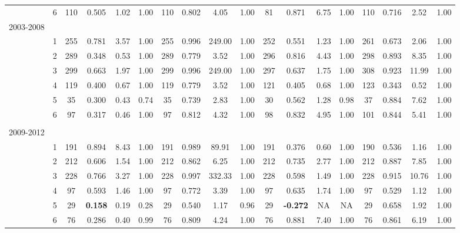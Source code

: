 \begin{sidewaystable}[p]
\begin{tabular}{p{1cm}p{.5cm}cccccccccccccccc}
 & \multicolumn{ 1}{c}{6} & 110 & 0.505 & 1.02  & 1.00  & 110 & 0.802 & 4.05  & 1.00  & 81 & 0.871  & 6.75  & 1.00  & 110 & 0.716  & 2.52  & 1.00  \\ 
2003-2008\\
 & \multicolumn{ 1}{c}{1} & 255 & 0.781  & 3.57  & 1.00  & 255 & 0.996  & 249.00  & 1.00  & 252 & 0.551  & 1.23  & 1.00  & 261 & 0.673  & 2.06  & 1.00  \\ 
 & \multicolumn{ 1}{c}{2} & 289 & 0.348  & 0.53  & 1.00  & 289 & 0.779  & 3.52  & 1.00  & 296 & 0.816  & 4.43  & 1.00  & 298 & 0.893  & 8.35  & 1.00  \\ 
 & \multicolumn{ 1}{c}{3} & 299 & 0.663  & 1.97  & 1.00  & 299 & 0.996  & 249.00  & 1.00  & 297 & 0.637  & 1.75  & 1.00  & 308 & 0.923  & 11.99  & 1.00  \\ 
 & \multicolumn{ 1}{c}{4} & 119 & 0.400  & 0.67  & 1.00  & 119 & 0.779  & 3.52  & 1.00  & 121 & 0.405  & 0.68  & 1.00  & 123 & 0.343  & 0.52  & 1.00  \\ 
 & \multicolumn{ 1}{c}{5} & 35 & 0.300  & 0.43  & 0.74  & 35 & 0.739  & 2.83  & 1.00  & 30 & 0.562  & 1.28  & 0.98  & 37 & 0.884  & 7.62  & 1.00  \\ 
 & \multicolumn{ 1}{c}{6} & 97 & 0.317 & 0.46  & 1.00  & 97 & 0.812 & 4.32  & 1.00  & 98 & 0.832  & 4.95  & 1.00  & 101 & 0.844  & 5.41  & 1.00  \\ \\
2009-2012\\
 & \multicolumn{ 1}{c}{1} & 191 & 0.894  & 8.43  & 1.00  & 191 & 0.989  & 89.91  & 1.00  & 191 & 0.376  & 0.60  & 1.00  & 190 & 0.536  & 1.16  & 1.00  \\ 
\multicolumn{ 1}{c}{} & \multicolumn{ 1}{c}{2} & 212 & 0.606  & 1.54  & 1.00  & 212 & 0.862  & 6.25  & 1.00  & 212 & 0.735  & 2.77  & 1.00  & 212 & 0.887  & 7.85  & 1.00  \\ 
\multicolumn{ 1}{c}{} & \multicolumn{ 1}{c}{3} & 228 & 0.766  & 3.27  & 1.00  & 228 & 0.997  & 332.33  & 1.00  & 228 & 0.598  & 1.49  & 1.00  & 228 & 0.915  & 10.76  & 1.00  \\ 
\multicolumn{ 1}{c}{} & \multicolumn{ 1}{c}{4} & 97 & 0.593  & 1.46  & 1.00  & 97 & 0.772  & 3.39  & 1.00  & 97 & 0.635  & 1.74  & 1.00  & 97 & 0.529  & 1.12  & 1.00  \\ 
\multicolumn{ 1}{c}{} & \multicolumn{ 1}{c}{5} & 29 & \textbf{0.158 } & 0.19  & 0.28  & 29 & 0.540  & 1.17  & 0.96  & 29 & \textbf{-0.272 } & NA & NA & 29 & 0.658  & 1.92  & 1.00  \\ 
\multicolumn{ 1}{c}{} & \multicolumn{ 1}{c}{6} & 76 & 0.286 & 0.40  & 0.99  & 76 & 0.809 & 4.24  & 1.00  & 76 & 0.881  & 7.40  & 1.00  & 76 & 0.861  & 6.19  & 1.00  \\ \hline
\end{tabular}
\label{tab:SWposthoc}
\end{sidewaystable}